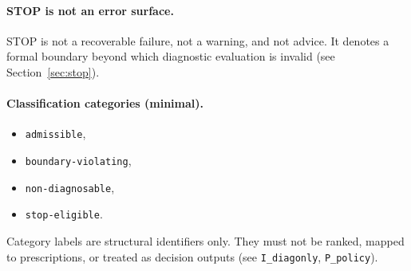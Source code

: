 \paragraph{STOP is not an error surface.}
STOP is not a recoverable failure, not a warning, and not advice.
It denotes a formal boundary beyond which diagnostic evaluation is invalid
(see Section~\ref{sec:stop}).

\paragraph{Classification categories (minimal).}
\begin{itemize}
  \item \texttt{admissible},
  \item \texttt{boundary-violating},
  \item \texttt{non-diagnosable},
  \item \texttt{stop-eligible}.
\end{itemize}

Category labels are structural identifiers only.
They must not be ranked, mapped to prescriptions,
or treated as decision outputs (see \texttt{I\_diagonly}, \texttt{P\_policy}).
